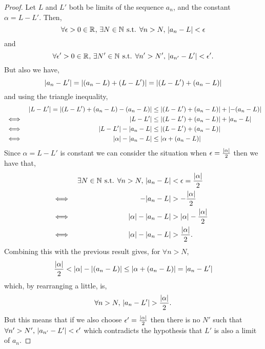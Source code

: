 \documentclass[MathsNotesBase.tex]{subfiles}
\begin{document}
{		\bigskip	
		\begin{proof}
			Let $L$ and $L'$ both be limits of the sequence $a_n$, and the constant $\alpha = L - L'$. Then,
			\[ \forall \epsilon > 0 \in \mathbb{R}^{} ,\, \exists N \in \mathbb{N}^{} \text{ s.t. } \forall n > N ,\, \lvert a_{n} - L\rvert < \epsilon \] and
			\[ \forall \epsilon' > 0 \in \mathbb{R}^{} ,\, \exists N' \in \mathbb{N}^{} \text{ s.t. } \forall n' > N' ,\, \lvert a_{n'} - L'\rvert < \epsilon'. \]
			But also we have,
			\[ \lvert a_n - L'\rvert = \lvert(a_n - L) + (L - L')\rvert = \lvert(L - L') + (a_n - L)\rvert \]
			and using the triangle inequality,
			\begin{align*}
			&& \lvert L - L'\rvert = \lvert(L - L') + (a_n - L) - (a_n - L)\rvert &\leq \lvert(L - L') + (a_n - L)\rvert + \lvert-(a_n - L)\rvert \\
			&\iff & \lvert L - L'\rvert  &\leq \lvert(L - L') + (a_n - L)\rvert + \lvert a_n - L\rvert\\
			&\iff & \lvert L - L'\rvert - \lvert a_n - L\rvert  &\leq \lvert(L - L') + (a_n - L)\rvert\\
			&\iff & \lvert\alpha\rvert - \lvert a_n - L\rvert  &\leq \lvert\alpha + (a_n - L)\rvert\\
			\end{align*}
			Since $\alpha = L - L'$ is constant we can consider the situation when $\epsilon = \frac{\lvert\alpha\rvert}{2}$ then we have that,
			\begin{align*}
			&& \exists N \in \mathbb{N}^{} \text{ s.t. } \forall n > N ,\, \lvert a_{n} - L\rvert &< \epsilon = \frac{\lvert\alpha\rvert}{2} \\
			&\iff &  -\lvert a_{n} - L\rvert &> -\frac{\lvert\alpha\rvert}{2}  &\text{\scriptsize{}}\\
			&\iff & \lvert\alpha\rvert - \lvert a_{n} - L\rvert &> \lvert\alpha\rvert - \frac{\lvert\alpha\rvert}{2}  &\text{\scriptsize{}}\\
			&\iff & \lvert\alpha\rvert - \lvert a_{n} - L\rvert &> \frac{\lvert\alpha\rvert}{2}.  &\text{\scriptsize{}}\\
			\end{align*}
			Combining this with the previous result gives, for $\forall n > N$,
			\[ \frac{\lvert\alpha\rvert}{2} < \lvert\alpha\rvert - \lvert(a_n - L)\rvert  \leq \lvert\alpha + (a_n - L)\rvert = \lvert a_n - L'\rvert \]
			which, by rearranging a little, is,
			\[ \forall n > N,\, \lvert a_n - L'\rvert > \frac{\lvert\alpha\rvert}{2}. \]
			But this means that if we also choose $\epsilon' = \frac{\lvert\alpha\rvert}{2}$ then there is no $N'$ such that $\forall n' > N' ,\, \lvert a_{n'} - L'\rvert < \epsilon'$ which contradicts the hypothesis that $L'$ is also a limit of $a_n$.

\end{proof}}
\end{document}
